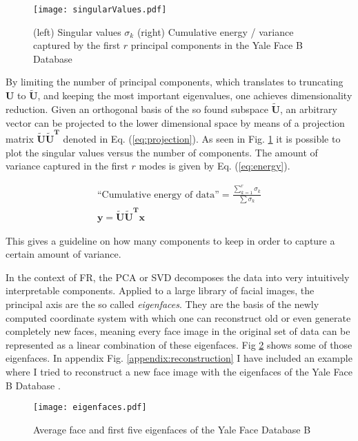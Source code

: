 
\begin{figure}[ht]  
  \centering
  \texttt{[image: singularValues.pdf]}
  \caption{(left) Singular values $\sigma_k$ (right) Cumulative energy /
  variance captured by the first $r$ principal components in the Yale Face B
  Database}
  \label{sv}
\end{figure}

By limiting the number of principal components, which translates to truncating
$\mathbf{U}$ to $\tilde{\mathbf{U}}$, and keeping the most important
eigenvalues, one achieves dimensionality reduction. Given an orthogonal basis of
the so found subspace $\tilde{\mathbf{U}}$, an arbitrary vector can be projected
to the lower dimensional space by means of a projection matrix
$\mathbf{\tilde{U}\tilde{U}^T}$ denoted in Eq. (\ref{eq:projection}). As seen in
Fig. \ref{sv} it is possible to plot the singular values versus the number of
components. The amount of variance captured in the first $r$ modes is given by
Eq. (\ref{eq:energy}).

\begin{gather}
 \textrm{``Cumulative energy of data''} = \frac{\sum\limits_{k=1}^{r}{\sigma_k}}{\sum{\sigma_k}} \label{eq:energy} \\
 \mathbf{y = \tilde{U}\tilde{U}^Tx} \label{eq:projection}
\end{gather}

This gives a guideline on how many components to keep in order to capture a
certain amount of variance.

In the context of FR, the PCA or SVD decomposes the data into very intuitively
interpretable components. Applied to a large library of facial images, the
principal axis are the so called \textit{eigenfaces}. They are the basis of the
newly computed coordinate system with which one can reconstruct old or even
generate completely new faces, meaning every face image in the original set of
data can be represented as a linear combination of these eigenfaces. Fig
\ref{eigenfaces} shows some of those eigenfaces. In appendix Fig.
\ref{appendix:reconstruction} I have included an example where I tried to
reconstruct a new face image with the eigenfaces of the Yale Face B Database
\cite{yalefaceB}. 

\begin{figure}[ht]
  \centering
  \texttt{[image: eigenfaces.pdf]}
  \caption{Average face and first five eigenfaces of the Yale Face Database B}
  \label{eigenfaces}
\end{figure}

